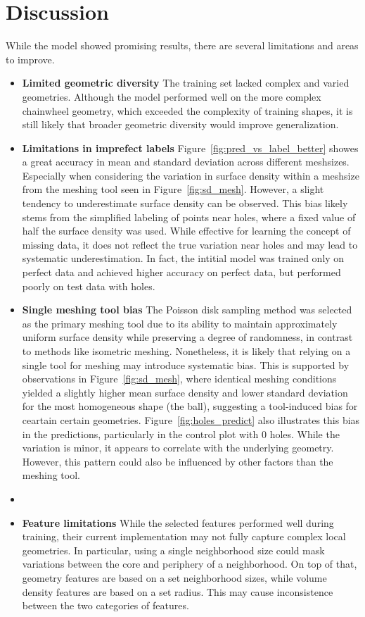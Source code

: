 \section{Discussion}
While the model showed promising results, there are several limitations and areas to improve.

\begin{itemize}
    \item \textbf{Limited geometric diversity}
    The training set lacked complex and varied geometries. Although the model performed well on the more complex chainwheel geometry, which exceeded the complexity of training shapes, it is still likely that broader geometric diversity would improve generalization.
    \item \textbf{Limitations in imprefect labels}
    Figure~\ref{fig:pred_vs_label_better} showes a great accuracy in mean and standard deviation across different meshsizes. Especially when considering the variation in surface density within a meshsize from the meshing tool seen in Figure~\ref{fig:sd_mesh}. However, a slight tendency to underestimate surface density can be observed. This bias likely stems from the simplified labeling of points near holes, where a fixed value of half the surface density was used. While effective for learning the concept of missing data, it does not reflect the true variation near holes and may lead to systematic underestimation. In fact, the intitial model was trained only on perfect data and achieved higher accuracy on perfect data, but performed poorly on test data with holes.
    \item \textbf{Single meshing tool bias}
    The Poisson disk sampling method was selected as the primary meshing tool due to its ability to maintain approximately uniform surface density while preserving a degree of randomness, in contrast to methods like isometric meshing. Nonetheless, it is likely that relying on a single tool for meshing may introduce systematic bias. This is supported by observations in Figure~\ref{fig:sd_mesh}, where identical meshing conditions yielded a slightly higher mean surface density and lower standard deviation for the most homogeneous shape (the ball), suggesting a tool-induced bias for ceartain certain geometries. Figure~\ref{fig:holes_predict} also illustrates this bias in the predictions, particularly in the control plot with 0 holes. While the variation is minor, it appears to correlate with the underlying geometry. However, this pattern could also be influenced by other factors than the meshing tool.
    \item \item \textbf{Feature limitations}
    While the selected features performed well during training, their current implementation may not fully capture complex local geometries. In particular, using a single neighborhood size could mask variations between the core and periphery of a neighborhood. On top of that, geometry features are based on a set neighborhood sizes, while volume density features are based on a set radius. This may cause inconsistence between the two categories of features.
\end{itemize}